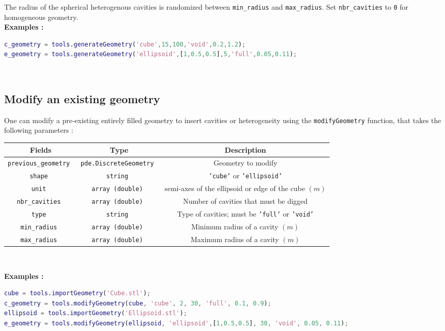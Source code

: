 The radius of the spherical heterogenous cavities is randomized between {\tt min\_radius} and {\tt max\_radius}. Set {\tt nbr\_cavities} to {\tt 0} for homogeneous geometry.\\

\textbf{Examples :}\\

\begin{lstlisting}[language=Matlab]
c_geometry = tools.generateGeometry('cube',15,100,'void',0.2,1.2); 
e_geometry = tools.generateGeometry('ellipsoid',[1,0.5,0.5],5,'full',0.05,0.11); 
\end{lstlisting}
\ 


\subsection{Modify an existing geometry}

One can modify a pre-existing entirely filled geometry to insert cavities or heterogeneity using the {\tt modifyGeometry} function, that takes the following parameters : 

\renewcommand{\arraystretch}{1.5}
\begin{table}[H]
    \centering
    \begin{tabular}{|>{\customfont}c|>{\customfont}c|>{\customfont}c|}
        \hline 
        \rowcolor{gray!30}
        \textbf{Fields} & \textbf{Type} & \textbf{Description} \\ \hline
        \tt previous\_geometry & \tt pde.DiscreteGeometry & Geometry to modify \\ \hline
        \tt shape & \tt string & {\tt 'cube'} or {\tt 'ellipsoid'} \\ \hline 
        \tt unit & \tt array (double) & semi-axes of the ellipsoid or edge of the cube $(m)$ \\ \hline 
        \tt nbr\_cavities	& \tt array (double) & Number of cavities that must be digged \\ \hline 
        \tt type & \tt string & Type of cavities; must be {\tt 'full'} or {\tt 'void'} \\ \hline
        \tt min\_radius & \tt array (double) & Minimum radius of a cavity $(m)$ \\ \hline 
        \tt max\_radius & \tt array (double) & Maximum radius of a cavity $(m)$ \\ \hline 
    \end{tabular}
\end{table}
\ 

\textbf{Examples :}\\

\begin{lstlisting}[language=Matlab]
cube = tools.importGeometry('Cube.stl');
c_geometry = tools.modifyGeometry(cube, 'cube', 2, 30, 'full', 0.1, 0.9);
ellipsoid = tools.importGeometry('Ellipsoid.stl');
e_geometry = tools.modifyGeometry(ellipsoid, 'ellipsoid',[1,0.5,0.5], 30, 'void', 0.05, 0.11);
\end{lstlisting}
